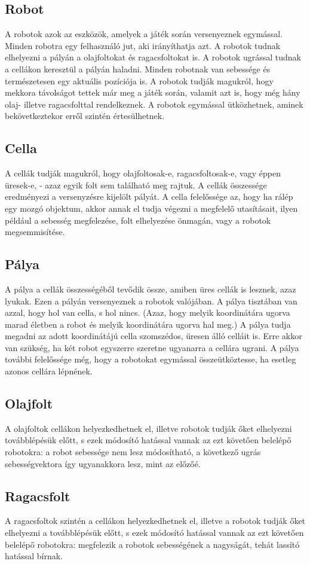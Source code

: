 
\subsection{Robot}

A robotok azok az eszközök, amelyek a játék során versenyeznek egymással. Minden robotra egy felhasználó jut, aki irányíthatja azt. A robotok tudnak elhelyezni a pályán a olajfoltokat és ragacsfoltokat is. A robotok ugrással tudnak a cellákon keresztül a pályán haladni. Minden robotnak van sebessége és természetesen egy aktuális pozíciója is. A robotok tudják magukról, hogy mekkora távolságot tettek már meg a játék során, valamit azt is, hogy még hány olaj- illetve ragacsfolttal rendelkeznek. A robotok egymással ütközhetnek, aminek bekövetkeztekor erről szintén értesülhetnek.

\subsection{Cella}

A cellák tudják magukról, hogy olajfoltosak-e, ragacsfoltosak-e, vagy éppen üresek-e, - azaz egyik folt sem található meg rajtuk. A cellák összessége eredményezi a versenyzésre kijelölt pályát. A cella felelőssége az, hogy ha rálép egy mozgó objektum, akkor annak el tudja végezni a megfelelő utasításait, ilyen például a sebesség megfelezése, folt elhelyezése önmagán, vagy a robotok megsemmisítése.

\subsection{Pálya}

A pálya a cellák összességéből tevődik össze, amiben üres cellák is lesznek, azaz lyukak. Ezen a pályán versenyeznek a robotok valójában. A pálya tisztában van azzal, hogy hol van cella, s hol nincs. (Azaz, hogy melyik koordinátára ugorva marad életben a robot és melyik koordinátára ugorva hal meg.) A pálya tudja megadni az adott koordinátájú cella szomszédos, üresen álló celláit is. Erre akkor van szükség, ha két robot egyszerre szeretne ugyanarra a cellára ugrani. A pálya további felelőssége még, hogy a robotokat egymással összeütköztesse, ha esetleg azonos cellára lépnének. 

\subsection{Olajfolt}

A olajfoltok cellákon helyezkedhetnek el, illetve robotok tudják őket elhelyezni továbblépésük előtt, s ezek módosító hatással vannak az ezt követően belelépő robotokra: a robot sebessége nem lesz módosítható, a következő ugrás sebességvektora így ugyanakkora lesz, mint az előzőé.

\subsection{Ragacsfolt}

A ragacsfoltok szintén a cellákon helyezkedhetnek el, illetve a robotok tudják őket elhelyezni a továbblépésük előtt, s ezek módosító hatással vannak az ezt követően belelépő robotokra: megfelezik a robotok sebességének a nagyságát, tehát lassító hatással bírnak.
